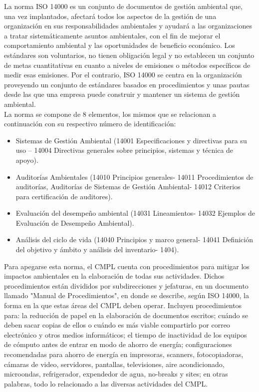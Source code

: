 	La norma ISO 14000 es un conjunto de documentos de gestión ambiental que, una vez implantados, afectará todos los aspectos de la gestión de una organización en sus responsabilidades ambientales y ayudará a las organizaciones a tratar sistemáticamente asuntos ambientales, con el fin de mejorar el comportamiento ambiental y las oportunidades de beneficio económico. Los estándares son voluntarios, no tienen obligación legal y no establecen un conjunto de metas cuantitativas en cuanto a niveles de emisiones o métodos específicos de medir esas emisiones. Por el contrario, ISO 14000 se centra en la organización proveyendo un conjunto de estándares basados en procedimientos y unas pautas desde las que una empresa puede construir y mantener un sistema de gestión ambiental. \cite{ISO14000}\\
	
	La norma se compone de 8 elementos, los mismos que se relacionan a continuación con su respectivo número de identificación:\\
	
	\begin{itemize}
		\item Sistemas de Gestión Ambiental (14001 Especificaciones y directivas para su uso – 14004 Directivas generales sobre principios, sistemas y técnica de apoyo).
		\item Auditorías Ambientales (14010 Principios generales- 14011 Procedimientos de auditorías, Auditorías de Sistemas de Gestión Ambiental- 14012 Criterios para certificación de auditores).
		\item Evaluación del desempeño ambiental (14031 Lineamientos- 14032 Ejemplos de Evaluación de Desempeño Ambiental).
		\item Análisis del ciclo de vida (14040 Principios y marco general- 14041 Definición del objetivo y ámbito y análisis del inventario- 1404).
	\end{itemize}

	Para apegarse esta norma, el CMPL cuenta con procedimientos para mitigar los impactos ambientales en la elaboración de todas sus actividades. Dichos procedimientos están divididos por subdirecciones y jefaturas, en un documento llamado "Manual de Procedimientos", en donde se describe, según ISO 14000, la forma en la que estas áreas del CMPL deben operar. Incluyen procedimientos para: la reducción de papel en la elaboración de documentos escritos; cuándo se deben sacar copias de ellos o cuándo es más viable compartirlo por correo electrónico y otros medios informáticos; el tiempo de inactividad de los equipos de cómputo antes de entrar en modo de ahorro de energía; configuraciones recomendadas para ahorro de energía en impresoras, scanners, fotocopiadoras, cámaras de video, servidores, pantallas, televisiones, aire acondicionado, microondas, refrigerador, expendedor de agua, no-breaks y sites; en otras palabras, todo lo relacionado a las diversas actividades del CMPL.\\
	
